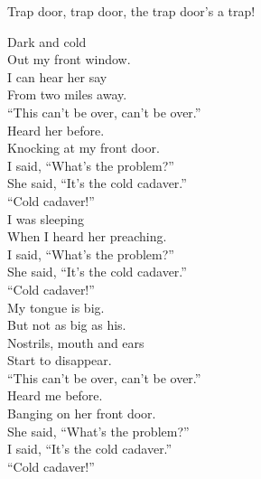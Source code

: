 Trap door, trap door, the trap door's a trap! \\




Dark and cold \\
Out my front window. \\
I can hear her say \\
From two miles away. \\

``This can't be over, can't be over.'' \\

Heard her before. \\
Knocking at my front door. \\
I said, ``What's the problem?'' \\
She said, ``It's the cold cadaver.'' \\

``Cold cadaver!'' \\

I was sleeping \\
When I heard her preaching. \\
I said, ``What's the problem?'' \\
She said, ``It's the cold cadaver.'' \\

``Cold cadaver!'' \\

My tongue is big. \\
But not as big as his. \\
Nostrils, mouth and ears \\
Start to disappear. \\

``This can't be over, can't be over.'' \\
Heard me before. \\
Banging on her front door. \\
She said, ``What's the problem?'' \\
I said, ``It's the cold cadaver.'' \\

``Cold cadaver!'' \\




